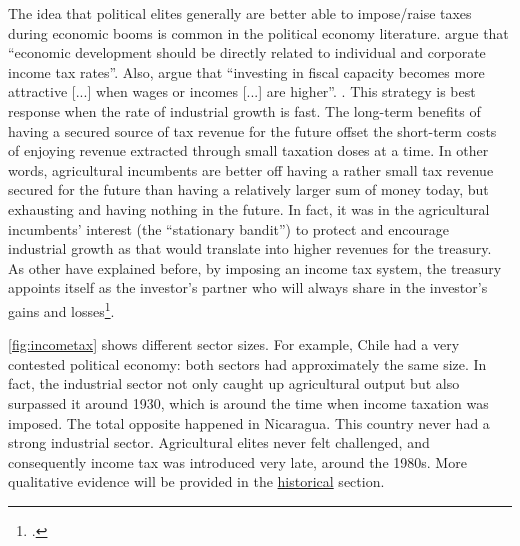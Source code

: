 \documentclass[onesided]{article}\usepackage[]{graphicx}\usepackage[]{color}
\begin{document}
{	The idea that political elites generally are better able to impose/raise  taxes during economic booms is common in the political economy literature. \citet[p. 647]{Campbell1994} argue that ``economic development should be directly related to individual and corporate income tax rates''. Also, \citet[p. 59]{Besley:2011aa} argue that ``investing in fiscal capacity becomes more attractive [...] when wages or incomes [...] are higher''.
	}. This strategy is best response when the rate of industrial growth is fast. The long-term benefits of having a secured source of tax revenue for the future offset the short-term costs of enjoying revenue extracted through  small taxation doses at a time. In other words, agricultural incumbents are better off having a rather small tax revenue secured for the future than having a relatively larger sum of money today, but exhausting and having nothing  in the future. In fact, it was in the agricultural incumbents' interest (the ``stationary bandit'') to protect and encourage industrial growth as that would translate into higher revenues for the treasury. As other have explained before, by imposing an income tax system, the treasury appoints itself as the investor's partner who will always share in the investor's gains and losses\footnote{\citet[p. 389]{Domar1944}.}.

\autoref{fig:incometax} shows different sector sizes. For example, Chile had a very contested political economy: both sectors had approximately the same size. In fact, the industrial sector not only caught up agricultural output but also surpassed it around 1930, which is around the time when income taxation was imposed. The total opposite happened in Nicaragua. This country never had a strong industrial sector. Agricultural elites never felt challenged, and consequently income tax was introduced very late, around the 1980s. More qualitative evidence will be provided in the \hyperref[unpacking]{historical} section.
\end{document}
